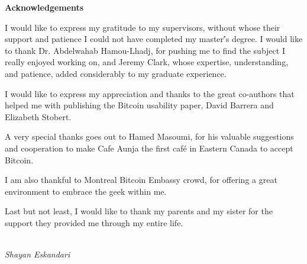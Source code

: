 
%

\begin{center}
{\bf Acknowledgements}
\end{center}
I would like to express my gratitude to my supervisors, without whose their support and patience I could not have completed my master\'’s degree. I would like to thank Dr. Abdelwahab Hamou-Lhadj, for pushing me to find the subject I really enjoyed working on, and Jeremy Clark, whose expertise, understanding, and patience, added considerably to my graduate experience.

\par I would like to express my appreciation and thanks to the great co-authors that helped me with publishing the Bitcoin usability paper, David Barrera and Elizabeth Stobert. 
\par A very special thanks goes out to Hamed Masoumi, for his valuable suggestions and cooperation to make Cafe Aunja the first caf\'{e} in Eastern Canada to accept Bitcoin.

\par I am also thankful to Montreal Bitcoin Embassy crowd, for offering a great environment to embrace the geek within me.
 
\par Last but not least, I would like to thank my parents and my sister for the support they provided me through my entire life.
\\\
\par 
\emph{Shayan Eskandari}
